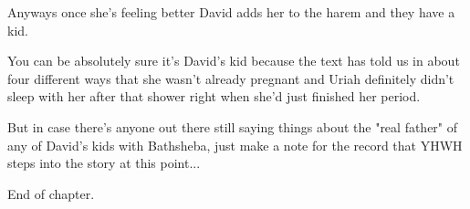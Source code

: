 {
}
{
}
{

	Anyways once she's feeling better David adds her to the harem
	and they have a kid.

	You can be absolutely sure it's David's kid because the text has
	told us in about four different ways that she wasn't already
	pregnant and Uriah definitely didn't sleep with her after that
	shower right when she'd just finished her period.

	But in case there's anyone out there still saying things about
	the "real father" of any of David's kids with Bathsheba, just
	make a note for the record that YHWH steps into the story at
	this point...

	End of chapter.
}
